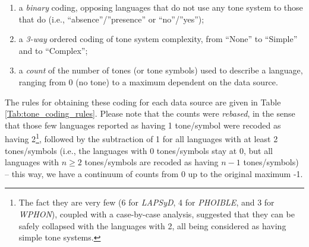 \documentclass[twoside,twocolumn]{article}
\begin{document}
\begin{enumerate}
  \item a \emph{binary} coding, opposing languages that do not use any tone system to those that do (i.e., ``absence''/''presence'' or ``no''/''yes'');
  \item a \emph{3-way} ordered coding of tone system complexity, from ``None'' to ``Simple'' and to ``Complex'';
  \item a \emph{count} of the number of tones (or tone symbols) used to describe a language, ranging from 0 (no tone) to a maximum dependent on the data source.
\end{enumerate}

The rules for obtaining these coding for each data source are given in Table \ref{Tab:tone_coding_rules}.
Please note that the counts were \emph{rebased}, in the sense that those few languages reported as having 1 tone/symbol were recoded as having 2\footnote{The fact they are very few (6 for \textit{LAPSyD}, 4 for \textit{PHOIBLE}, and 3 for \textit{WPHON}), coupled with a case-by-case analysis, suggested that they can be safely collapsed with the languages with 2, all being considered as having simple tone systems.}, followed by the subtraction of 1 for all languages with at least 2 tones/symbols (i.e., the languages with 0 tones/symbols stay at 0, but all languages with $n \geq 2$ tones/symbols are recoded as having $n-1$ tones/symbols) -- this way, we have a continuum of counts from 0 up to the original maximum -1.
\end{document}
